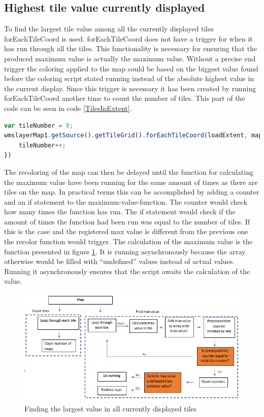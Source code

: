 \subsection{Highest tile value currently displayed}


To find the largest tile value among all the currently displayed tiles forEachTileCoord is used. forEachTileCoord does not have a trigger for when it has run through all the tiles. This functionality is necessary for ensuring that the produced maximum value is actually the maximum value. Without a precise end trigger the coloring applied to the map could be based on the biggest value found before the coloring script stated running instead of the absolute highest value in the current display.
Since this trigger is necessary it has been created by running forEachTileCoord another time to count the number of tiles. This part of the code can be seen in code \ref{TilesInExtent}.
\begin{lstlisting}[language=JavaScript, caption={Counting the amount of tiles within the current extent}, label= TilesInExtent,escapechar=|] 
var tileNumber = 0;
wmslayerMap1.getSource().getTileGrid().forEachTileCoord(loadExtent, mapZoom - zoomlevelAdjustment, function(tileCoord) {
	tileNumber++;
})
\end{lstlisting}
The recoloring of the map can then be delayed until the function for calculating the maximum value have been running for the same amount of times as there are tiles on the map. In practical terms this can be accomplished by adding a counter and an if statement to the maximum-value-function. The counter would check how many times the function has run. The if statement would check if the amount of times the function had been run was equal to the number of tiles. If this is the case and the registered max value is different from the previous one the recolor function would trigger.
The calculation of the maximum value is the function presented in figure \ref{DoubleLoop}. It is running asynchronously because the array otherwise would be filled with “undefined” values instead of actual values. Running it asynchronously ensures that the script awaits the calculation of the value.  
\begin{figure} [H]
	\centering
	\includegraphics[width=1\textwidth]{Pictures/DoubleLoop}
	\caption{Finding the largest value in all currently displayed tiles}
	\label{DoubleLoop}
\end{figure}

